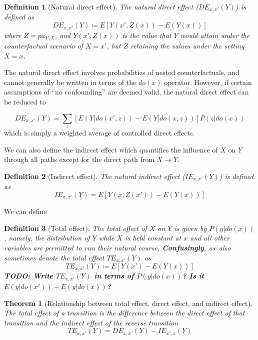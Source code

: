 \documentclass[11pt]{article}
\numberwithin{equation}{section}
\newcommand{\defeq}{\coloneqq}
\newtheorem{thm}{Theorem}[section]
\newtheorem{defn}{Definition}[section]
\begin{document}
\begin{defn}[Natural direct effect]
The natural direct effect ($DE_{x,x'}(Y)$) is defined as
\begin{equation}
DE_{x,x'}(Y) \defeq E[Y(x', Z(x)) - E(Y(x))]
\end{equation}
where $Z= pa_{Y\setminus X}$, and $Y(x', Z(x))$ is the value that $Y$ would attain under the counterfactual scenario of $X=x'$, but $Z$ retaining the values under the setting $X=x$.
\end{defn}

The natural direct effect involves probabilities of nested counterfactuals, and cannot generally be written in terms of the $do(x)$ operator. However, if certain assumptions of ``no confounding'' are deemed valid, the natural direct effect can be reduced to 

\begin{equation}
DE_{x,x'}(Y) = \sum_z [E(Y|do(x', z)) - E(Y| do(x,z))]P(z|do(x))
\end{equation}
which is simply a weighted average of controlled direct effects. 

We can also define the indirect effect which quantifies the influence of $X$ on $Y$ through all paths except for the direct path from $X \rightarrow Y$.
\begin{defn}[Indirect effect]
The natural indirect effect ($IE_{x,x'}(Y)$) is defined as
\begin{equation}
IE_{x,x'}(Y) = E[Y(x, Z(x')) - E(Y(x))]
\end{equation}
\end{defn}
We can define 
\begin{defn}[Total effect] 
The total effect of $X$ on $Y$ is given by $P(y|do(x))$, namely, the distribution of $Y$ while $X$ is held constant at $x$ and all other variables are permitted to run their natural course.  \textbf{Confusingly}, we also sometimes denote the total effect $TE_{x,x'}(Y)$ as 
\begin{equation}
TE_{x,x'}(Y) \defeq E[Y(x') - E(Y(x))] 
\end{equation}
\textbf{TODO: Write $TE_{x,x'}(Y)$ in terms of $P(y|do(x))$? Is it $E(y|do(x')) - E(y|do(x))$?}
\end{defn}

\begin{thm}[Relationship between total effect, direct effect, and indirect effect]
The total effect of a transition is the \textit{difference} between the direct effect of that transition and the indirect effect of the reverse transition
\begin{equation}
TE_{x,x'}(Y) = DE_{x,x'}(Y) - IE_{x',x}(Y)
\end{equation}
\end{thm}
\end{document}
